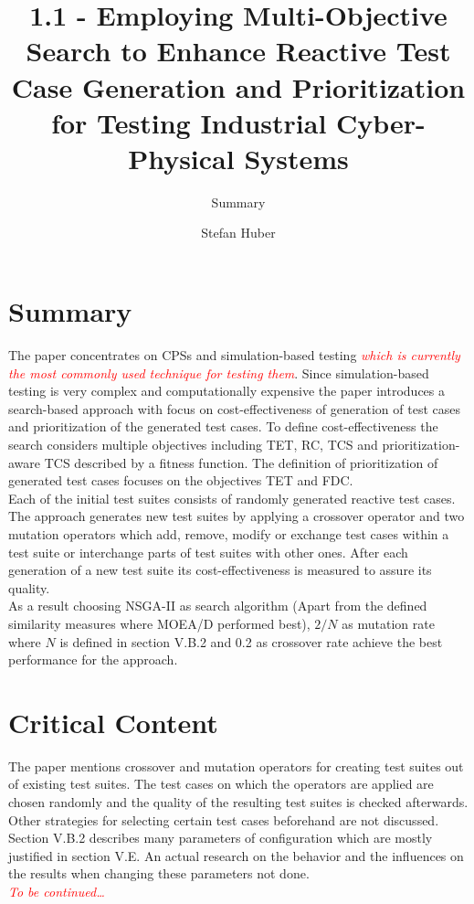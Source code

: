 \documentclass[oneside, notitlepage, twocolumn]{scrartcl}
\title{\LARGE 1.1 - Employing Multi-Objective Search to Enhance Reactive Test Case Generation and Prioritization for Testing Industrial Cyber-Physical Systems}
\subtitle{Summary}
\author{Stefan Huber}
\newcommand{\draft}[1]{\textcolor{red}{\textit{#1}}}
\begin{document}
\maketitle

\section{Summary}
The paper concentrates on \ac{CPS}s and simulation-based testing \draft{which is currently the most commonly used technique for testing them}.
Since simulation-based testing is very complex and computationally expensive the paper introduces a search-based approach with focus on cost-effectiveness of generation of test cases and prioritization of the generated test cases.
To define cost-effectiveness the search considers multiple objectives including \ac{TET}, \ac{RC}, \ac{TCS} and prioritization-aware \ac{TCS} described by a fitness function.
The definition of prioritization of generated test cases focuses on the objectives \ac{TET} and \ac{FDC}.\\
Each of the initial test suites consists of randomly generated reactive test cases.
The approach generates new test suites  by applying a crossover operator and two mutation operators which add, remove, modify or exchange test cases within a test suite or interchange parts of test suites with other ones.
After each generation of a new test suite its cost-effectiveness is measured to assure its quality.\\
As a result choosing \ac{NSGA-II} as search algorithm (Apart from the defined similarity measures where \ac{MOEA/D} performed best), \(2/N\) as mutation rate where \(N\) is defined in section V.B.2 and 0.2 as crossover rate achieve the best performance for the approach.

\section{Critical Content}
The paper mentions crossover and mutation operators for creating test suites out of existing test suites.
The test cases on which the operators are applied are chosen randomly and the quality of the resulting test suites is checked afterwards.
Other strategies for selecting certain test cases beforehand are not discussed.\\
Section V.B.2 describes many parameters of configuration which are mostly justified in section V.E.
An actual research on the behavior and the influences on the results when changing these parameters not done.\\
\draft{To be continued\ldots}
\end{document}
